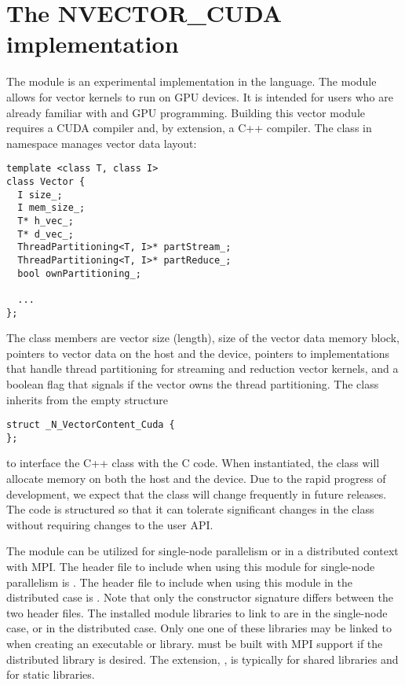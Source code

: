 %
\section{The NVECTOR\_CUDA implementation}\label{ss:nvec_cuda}

The {\nveccuda} module is an experimental {\nvector} implementation in the {\cuda} language.
The module allows for {\sundials} vector kernels to run on GPU devices. It is intended for users
who are already familiar with {\cuda} and GPU programming. Building this vector
module requires a CUDA compiler and, by extension, a C++ compiler. The class 
in namespace  manages vector data layout:
\begin{verbatim}
template <class T, class I>
class Vector {
  I size_;
  I mem_size_;
  T* h_vec_;
  T* d_vec_;
  ThreadPartitioning<T, I>* partStream_;
  ThreadPartitioning<T, I>* partReduce_;
  bool ownPartitioning_;

  ...
};
\end{verbatim}

The class members are vector size (length), size of the vector data memory block, pointers
to vector data on the host and the device, pointers to 
implementations that handle thread partitioning for streaming and
reduction vector kernels, and a boolean flag that signals if the
vector owns the thread partitioning. The class  inherits from the empty structure
\begin{verbatim}
struct _N_VectorContent_Cuda {
};
\end{verbatim}
to interface the C++ class with the {\nvector} C code. When instantiated, the class
 will allocate memory on both the host and the device. Due to the rapid
progress of {\cuda} development, we expect that the 
class will change frequently in future {\sundials} releases. The code is
structured so that it can tolerate significant changes in the
 class without requiring changes to the user API.


The {\nveccuda} module can be utilized for single-node parallelism or in a distributed context with MPI.
The header file to include when using this module for single-node parallelism is .
The header file to include when using this module in the distributed case is .
Note that only the {\nveccuda} constructor signature differs between the two header files.
The installed module libraries to link to are  in the single-node case,
or  in the distributed case. Only one one of these libraries may be linked to when creating an executable or library. {\sundials} must be built with MPI support if the distributed library is desired. The extension, , is typically  for shared libraries and  for static libraries.

